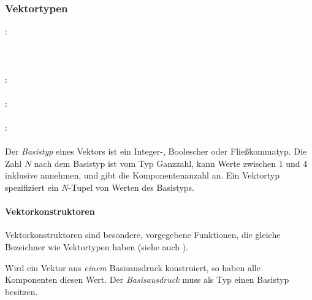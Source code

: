 \subsubsection{Vektortypen}\label{Vektortypen}
:\label{typ_vektor}\\
\hspace*{1cm} \\
\hspace*{1cm} \\
\hspace*{1cm} \\
:\label{typ_vektor_int}\\
\hspace*{1cm}\Gspace{}\\
:\label{typ_vektor_float}\\
\hspace*{1cm}\\
:\label{typ_vektor_bool}\\
\hspace*{1cm}\\



Der \emph{Basistyp} eines Vektors ist ein Integer-, Boolescher oder Fließkommatyp.
Die Zahl $N$ nach dem Basistyp ist vom Typ
Ganzzahl, kann Werte zwischen 1 und 4 inklusive annehmen, und gibt die Komponentenanzahl an.
 Ein Vektortyp spezifiziert ein $N$-Tupel von Werten
des Basistyps.

\paragraph{Vektorkonstruktoren}\label{Vektorkonstruktoren}

Vektorkonstruktoren sind besondere, vorgegebene Funktionen, die gleiche Bezeichner wie Vektortypen haben
(siehe auch ).

Wird ein Vektor aus \emph{einem} Basisausdruck konstruiert, so haben alle Komponenten diesen Wert.
Der \emph{Basisausdruck} muss als Typ einen Basistyp besitzen.

